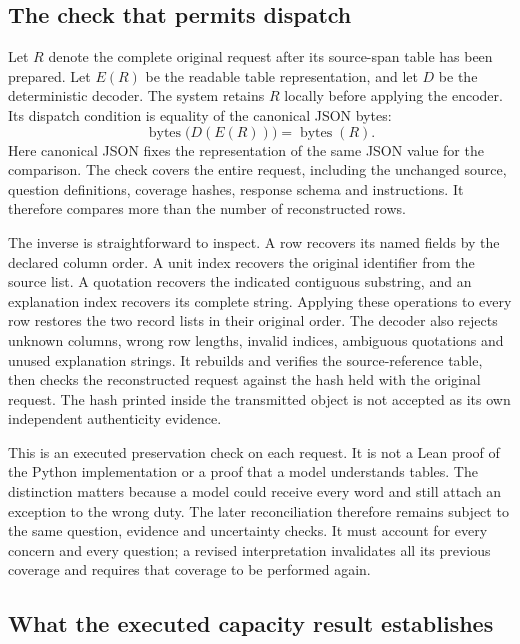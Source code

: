\documentclass[12pt,a4paper,oneside,openany]{book}
\begin{document}
\subsection{The check that permits dispatch}

Let $R$ denote the complete original request after its source-span table has
been prepared. Let $E(R)$ be the readable table representation, and let $D$ be
the deterministic decoder. The system retains $R$ locally before applying the
encoder. Its dispatch condition is equality of the canonical JSON bytes:
\begin{equation}
 \operatorname{bytes}\bigl(D(E(R))\bigr)
   = \operatorname{bytes}(R).
 \label{eq:lossless-request-roundtrip}
\end{equation}
Here canonical JSON fixes the representation of the same JSON value for the
comparison. The check covers the entire request, including the unchanged source,
question definitions, coverage hashes, response schema and instructions. It
therefore compares more than the number of reconstructed rows.

The inverse is straightforward to inspect. A row recovers its named fields by
the declared column order. A unit index recovers the original identifier from
the source list. A quotation recovers the indicated contiguous substring, and
an explanation index recovers its complete string. Applying these operations to
every row restores the two record lists in their original order. The decoder
also rejects unknown columns, wrong row lengths, invalid indices, ambiguous
quotations and unused explanation strings. It rebuilds and verifies the
source-reference table, then checks the reconstructed request against the hash
held with the original request. The hash printed inside the transmitted object
is not accepted as its own independent authenticity evidence.

This is an executed preservation check on each request. It is not a Lean proof
of the Python implementation or a proof that a model understands tables. The
distinction matters because a model could receive every word and still attach
an exception to the wrong duty. The later reconciliation therefore remains
subject to the same question, evidence and uncertainty checks. It must account
for every concern and every question; a revised interpretation invalidates all
its previous coverage and requires that coverage to be performed again.

\subsection{What the executed capacity result establishes}
\end{document}
